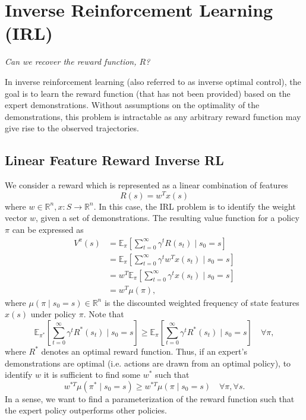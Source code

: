 \documentclass{article}
\newcommand{\E}{\mathbb{E}}                                        %
\begin{document}
\section{Inverse Reinforcement Learning (IRL)}

{\centering \textit{Can we recover the reward function, $R$?}\par}

In inverse reinforcement learning (also referred to as inverse optimal control), the goal is to learn the reward function (that has not been provided) based on the expert demonstrations. Without assumptions on the optimality of the demonstrations, this problem is intractable as any arbitrary reward function may give rise to the observed trajectories.

\subsection{Linear Feature Reward Inverse RL}

We consider a reward which is represented as a linear combination of features
\begin{equation}
    R(s) = w^T x(s)
\end{equation}
where $w \in \mathbb{R}^n, x : S \to \mathbb{R}^n$. In this case, the IRL problem is to identify the weight vector $w$, given a set of demonstrations. The resulting value function for a policy $\pi$ can be expressed as
\begin{align}
    V^\pi(s)
    &= \E_\pi \left[ \sum_{t=0}^\infty \gamma^t R(s_t) \mid s_0 = s \right] \\
    &= \E_\pi \left[ \sum_{t=0}^\infty \gamma^t w^T x(s_t) \mid s_0 = s \right] \\
    &= w^T \E_\pi \left[ \sum_{t=0}^\infty \gamma^t x(s_t) \mid s_0 = s \right] \\
    &= w^T \mu(\pi),
\end{align}
where $\mu(\pi \mid s_0 = s) \in \mathbb{R}^n$ is the discounted weighted frequency of state features $x(s)$ under policy $\pi$. Note that
\begin{equation}
\E_{\pi^*} \left[ \sum_{t=0}^\infty \gamma^t R^*(s_t) \mid s_0 = s \right]
\geq \E_\pi \left[ \sum_{t=0}^\infty \gamma^t R^*(s_t) \mid s_0 = s \right] \quad \forall \pi,
\end{equation}
where $R^*$ denotes an optimal reward function. Thus, if an expert's demonstrations are optimal (i.e. actions are drawn from an optimal policy), to identify $w$ it is sufficient to find some $w^*$ such that
\begin{equation}
w^{*T} \mu(\pi^* \mid s_0 = s) \geq w^{*T} \mu(\pi \mid s_0 = s) \quad \forall \pi, \forall s.
\end{equation}
In a sense, we want to find a parameterization of the reward function such that the expert policy outperforms other policies.
\end{document}
